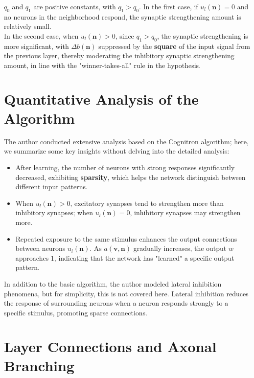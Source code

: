 \documentclass[11p,oneside]{book}
\begin{document}
$q_0$ and $q_1$ are positive constants, with $q_1 > q_0$. In the first case, if $u_l(\mathbf{n})=0$ and no neurons in the neighborhood respond, the synaptic strengthening amount is relatively small. \\

In the second case, when $u_l(\mathbf{n}) > 0$, since $q_1 > q_0$, the synaptic strengthening is more significant, with $\Delta b(\mathbf{n})$ suppressed by the \textbf{square} of the input signal from the previous layer, thereby moderating the inhibitory synaptic strengthening amount, in line with the "winner-takes-all" rule in the hypothesis. \\

\section*{Quantitative Analysis of the Algorithm}

The author conducted extensive analysis based on the Cognitron algorithm; here, we summarize some key insights without delving into the detailed analysis:

\begin{itemize}
    \item After learning, the number of neurons with strong responses significantly decreased, exhibiting \textbf{sparsity}, which helps the network distinguish between different input patterns.
    \item When $u_l(\mathbf{n}) > 0$, excitatory synapses tend to strengthen more than inhibitory synapses; when $u_l(\mathbf{n}) = 0$, inhibitory synapses may strengthen more.
    \item Repeated exposure to the same stimulus enhances the output connections between neurons $u_l(\mathbf{n})$. As $a(\mathbf{v,n})$ gradually increases, the output $w$ approaches 1, indicating that the network has "learned" a specific output pattern.
\end{itemize}

In addition to the basic algorithm, the author modeled lateral inhibition phenomena, but for simplicity, this is not covered here. Lateral inhibition reduces the response of surrounding neurons when a neuron responds strongly to a specific stimulus, promoting sparse connections.

\section*{Layer Connections and Axonal Branching}
\end{document}
